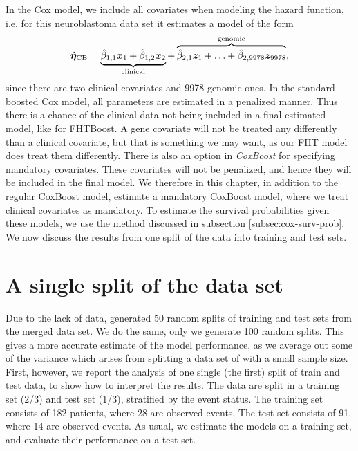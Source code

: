 In the Cox model, we include all covariates when modeling the hazard function, i.e. for this neuroblastoma data set it estimates a model of the form
\begin{equation*}
    \hat{\boldsymbol{\eta}}_{\text{CB}}=\underbrace{\hat{\beta}_{1,1}\bm{x}_1+\hat{\beta}_{1,2}\bm{x}_{2}}_{\text{clinical}}+\overbrace{\hat{\beta}_{2,1}\bm{z}_1+\ldots+\hat{\beta}_{2,9978}\bm{z}_{9978}}^{\text{genomic}},
\end{equation*}
since there are two clinical covariates and 9978 genomic ones.
In the standard boosted Cox model, all parameters are estimated in a penalized manner.
Thus there is a chance of the clinical data not being included in a final estimated model, like for FHTBoost.
A gene covariate will not be treated any differently than a clinical covariate, but that is something we may want, as our FHT model does treat them differently.
There is also an option in \textit{CoxBoost} for specifying mandatory covariates.
These covariates will not be penalized, and hence they will be included in the final model.
We therefore in this chapter, in addition to the regular CoxBoost model, estimate a mandatory CoxBoost model, where we treat clinical covariates as mandatory.
To estimate the survival probabilities given these models, we use the method discussed in subsection \ref{subsec:cox-surv-prob}.
We now discuss the results from one split of the data into training and test sets.

\section{A single split of the data set}
Due to the lack of data, \citet{bovelstad2009} generated 50 random splits of training and test sets from the merged data set.
We do the same, only we generate 100 random splits.
This gives a more accurate estimate of the model performance, as we average out some of the variance which arises from splitting a data set of with a small sample size.
First, however, we report the analysis of one single (the first) split of train and test data, to show how to interpret the results.
The data are split in a training set (2/3) and test set (1/3), stratified by the event status.
The training set consists of 182 patients, where 28 are observed events.
The test set consists of 91, where 14 are observed events.
As usual, we estimate the models on a training set, and evaluate their performance on a test set.

